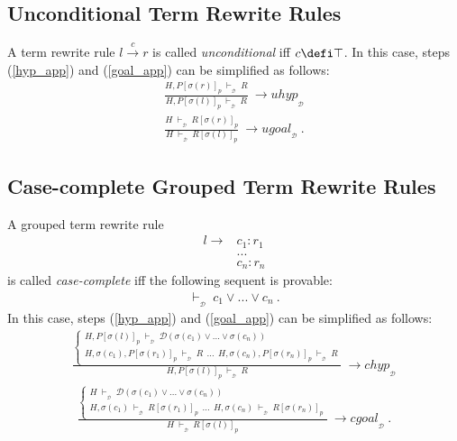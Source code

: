 \documentclass[copyright]{eptcs}
\begin{document}
\subsection{Unconditional Term Rewrite Rules}
A term rewrite rule $l \xrightarrow{c} r$ is called \textit{unconditional} iff $c \defi \top$. In this case, steps (\ref{hyp_app}) and (\ref{goal_app}) can be simplified as follows:
\begin{eqnarray}
\frac
	{
	H, P[\sigma(r)]_p~\vdash_{_\mathcal{D}}~R
	}
	{H, P[\sigma(l)]_p~\vdash_{_\mathcal{D}}~R}~\rightarrow uhyp_{_\mathcal{D}}\label{hyp_app2}
\end{eqnarray}
\begin{eqnarray}
\frac
	{
	H~\vdash_{_\mathcal{D}}~R[\sigma(r)]_p
	}
	{H~\vdash_{_\mathcal{D}}~R[\sigma(l)]_p}~\rightarrow ugoal_{_\mathcal{D}}~.\label{goal_app2}
\end{eqnarray}
\subsection{Case-complete Grouped Term Rewrite Rules}
A grouped term rewrite rule 
\begin{eqnarray*}
l \rightarrow &c_1: r_1\\
&...\\
&c_n: r_n
\end{eqnarray*}
is called \textit{case-complete} iff the following sequent is provable:
\begin{eqnarray*}
\vdash_{_\mathcal{D}}~c_1\lor ...\lor c_n~.
\end{eqnarray*}
In this case, steps (\ref{hyp_app}) and (\ref{goal_app}) can be simplified as follows:
\begin{eqnarray}
\frac
	{\left\{
	\begin{array}{l}
	H, P[\sigma(l)]_p~\vdash_{_\mathcal{D}}~\mathcal{D}(\sigma(c_1)\lor ...\lor \sigma(c_n)) \\
	H, \sigma(c_1), P[\sigma(r_1)]_p~\vdash_{_\mathcal{D}}~R~~...~~H, \sigma(c_n), P[\sigma(r_n)]_p~\vdash_{_\mathcal{D}}~R
	\end{array}\right.
	}
	{H, P[\sigma(l)]_p~\vdash_{_\mathcal{D}}~R}~\rightarrow chyp_{_\mathcal{D}}\label{hyp_app3}
\end{eqnarray}
\begin{eqnarray}
\frac
	{\left\{
	\begin{array}{l}
	H~\vdash_{_\mathcal{D}}~\mathcal{D}(\sigma(c_1)\lor ...\lor \sigma(c_n)) \\
	H, \sigma(c_1)~\vdash_{_\mathcal{D}}~R[\sigma(r_1)]_p~~...~~H, \sigma(c_n)~\vdash_{_\mathcal{D}}~R[\sigma(r_n)]_p
	\end{array}\right.
	}
	{H~\vdash_{_\mathcal{D}}~R[\sigma(l)]_p}~\rightarrow cgoal_{_\mathcal{D}}~.\label{goal_app3}
\end{eqnarray}
\end{document}
